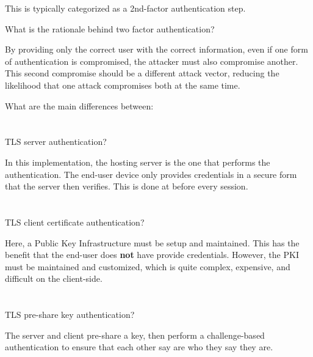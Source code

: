 \begin{questions}
\begin{solution}
    This is typically categorized as a 2nd-factor authentication step.
  \end{solution}

\question{} What is the rationale behind two factor authentication?
  \begin{solution}
    By providing only the correct user with the correct information, even if one form of authentication is compromised, the attacker must also compromise another.
    This second compromise should be a different attack vector, reducing the likelihood that one attack compromises both at the same time.
  \end{solution}

\question{} What are the main differences between:
  \begin{parts}
  \part{} TLS server authentication?
    \begin{solution}
      In this implementation, the hosting server is the one that performs the authentication.
      The end-user device only provides credentials in a secure form that the server then verifies.
      This is done at before every session.
    \end{solution}

  \part{} TLS client certificate authentication?
    \begin{solution}
      Here, a Public Key Infrastructure must be setup and maintained.
      This has the benefit that the end-user does \textbf{not} have provide credentials.
      However, the PKI must be maintained and customized, which is quite complex, expensive, and difficult on the client-side.
    \end{solution}

  \part{} TLS pre-share key authentication?
    \begin{solution}
      The server and client pre-share a key, then perform a challenge-based authentication to ensure that each other say are who they say they are.
    \end{solution}
  \end{parts}


\end{questions}
